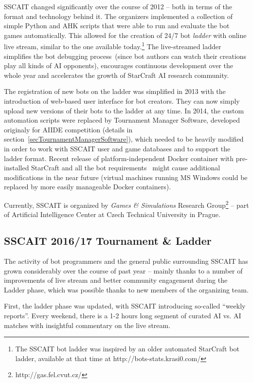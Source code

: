 SSCAIT changed significantly over the course of 2012 -- both in terms of the format and technology behind it. The organizers implemented a collection of simple Python and AHK scripts that were able to run and evaluate the bot games automatically. This allowed for the creation of 24/7 bot {\em ladder} with online live stream, similar to the one available today.\footnote{The SSCAIT bot ladder was inspired by an older automated StarCraft bot ladder, available at that time at http://bots-stats.krasi0.com/} The live-streamed ladder simplifies the bot debugging process~(since bot authors can watch their creations play all kinds of AI opponents), encourages continuous development over the whole year and accelerates the growth of StarCraft AI research community. 

The registration of new bots on the ladder was simplified in 2013 with the introduction of web-based user interface for bot creators. They can now simply upload new versions of their bots to the ladder at any time. In 2014, the custom automation scripts were replaced by Tournament Manager Software, developed originaly for AIIDE competition (details in section~\ref{secTournamentManagerSoftware}), which needed to be heavily modified in order to work with SSCAIT user and game databases and to support the ladder format. Recent release of platform-independent Docker container with pre-installed StarCraft and all the bot requirements~\cite{maly2018multi} might cause additional modifications in the near future (virtual machines running MS Windows could be replaced by more easily manageable Docker containers).

Currently, SSCAIT is organized by {\em Games \& Simulations} Research Group\footnote{http://gas.fel.cvut.cz/} -- part of Artificial Intelligence Center at Czech Technical University in Prague.

\subsection{SSCAIT 2016/17 Tournament \& Ladder}\label{subsecSSCAITnews}

The activity of bot programmers and the general public surrounding SSCAIT has grown considerably over the course of past year -- mainly thanks to a number of improvements of live stream and better community engagement during the Ladder phase, which was possible thanks to new members of the organizing team.

First, the ladder phase was updated, with SSCAIT introducing so-called ``weekly reports''. Every weekend, there is a 1-2 hours long segment of curated AI vs. AI matches with insightful commentary on the live stream.  

